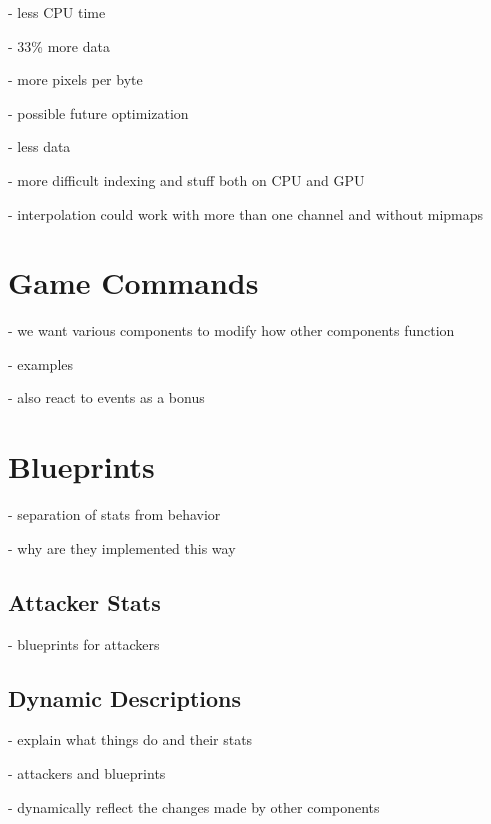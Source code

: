 - less CPU time

- 33\% more data

- more pixels per byte

- possible future optimization

- less data

- more difficult indexing and stuff both on CPU and GPU

- interpolation could work with more than one channel and without mipmaps

\section{Game Commands}

- we want various components to modify how other components function

- examples

- also react to events as a bonus

\section{Blueprints}

- separation of stats from behavior

- why are they implemented this way

\subsection{Attacker Stats}

- blueprints for attackers

\subsection{Dynamic Descriptions}

- explain what things do and their stats

- attackers and blueprints

- dynamically reflect the changes made by other components
